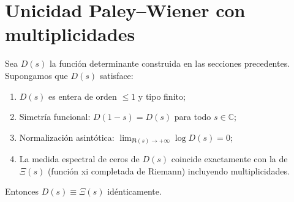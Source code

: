 \section{Unicidad Paley--Wiener con multiplicidades}

\begin{theorem}\label{thm:paley-wiener-uniqueness}
Sea $D(s)$ la función determinante construida en las secciones precedentes. Supongamos que $D(s)$ satisface:
\begin{enumerate}
\item $D(s)$ es entera de orden $\leq 1$ y tipo finito;
\item Simetría funcional: $D(1-s) = D(s)$ para todo $s \in \mathbb{C}$;
\item Normalización asintótica: $\lim_{\Re(s) \to +\infty} \log D(s) = 0$;
\item La medida espectral de ceros de $D(s)$ coincide exactamente con la de $\Xi(s)$ 
(función xi completada de Riemann) incluyendo multiplicidades.
\end{enumerate}
Entonces $D(s) \equiv \Xi(s)$ idénticamente.
\end{theorem}

